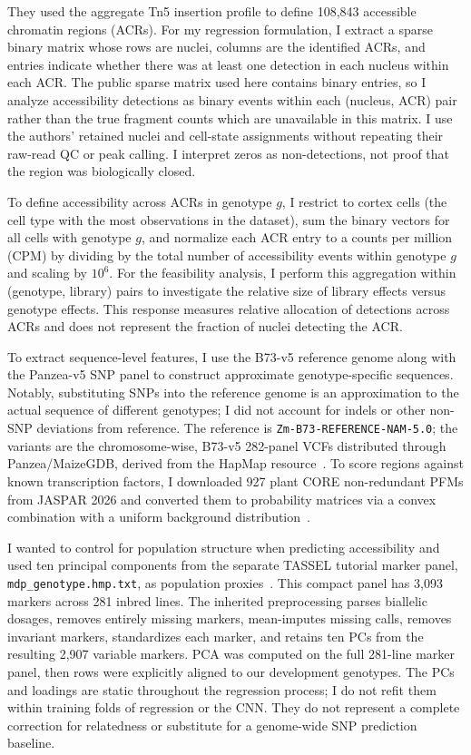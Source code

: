 \documentclass[10pt]{article}
\begin{document}
They used the aggregate Tn5 insertion profile to define 108,843 accessible chromatin regions (ACRs). For my regression formulation, I extract a sparse binary matrix whose rows are nuclei, columns are the identified ACRs, and entries indicate whether there was at least one detection in each nucleus within each ACR. The public sparse matrix used here contains binary entries, so I analyze accessibility detections as binary events within each (nucleus, ACR) pair rather than the true fragment counts which are unavailable in this matrix. I use the authors' retained nuclei and cell-state assignments without repeating their raw-read QC or peak calling. I interpret zeros as non-detections, not proof that the region was biologically closed.

To define accessibility across ACRs in genotype $g$, I restrict to cortex cells (the cell type with the most observations in the dataset), sum the binary vectors for all cells with genotype $g$, and normalize each ACR entry to a counts per million (CPM) by dividing by the total number of accessibility events within genotype $g$ and scaling by $10^6$. For the feasibility analysis, I perform this aggregation within (genotype, library) pairs to investigate the relative size of library effects versus genotype effects. This response measures relative allocation of detections across ACRs and does not represent the fraction of nuclei detecting the ACR.

To extract sequence-level features, I use the B73-v5 reference genome along with the Panzea-v5 SNP panel to construct approximate genotype-specific sequences. Notably, substituting SNPs into the reference genome is an approximation to the actual sequence of different genotypes; I did not account for indels or other non-SNP deviations from reference. The reference is \texttt{Zm-B73-REFERENCE-NAM-5.0}; the variants are the chromosome-wise, B73-v5 282-panel VCFs distributed through Panzea/MaizeGDB, derived from the HapMap resource~\cite{reference,panzea,hapmap}. To score regions against known transcription factors, I downloaded 927 plant CORE non-redundant PFMs from JASPAR 2026 and converted them to probability matrices via a convex combination with a uniform background distribution~\cite{jaspar}.

I wanted to control for population structure when predicting accessibility and used ten principal components from the separate TASSEL tutorial marker panel, \texttt{mdp\_genotype.hmp.txt}, as population proxies~\cite{tassel}. This compact panel has 3,093 markers across 281 inbred lines. The inherited preprocessing parses biallelic dosages, removes entirely missing markers, mean-imputes missing calls, removes invariant markers, standardizes each marker, and retains ten PCs from the resulting 2,907 variable markers. PCA was computed on the full 281-line marker panel, then rows were explicitly aligned to our development genotypes. The PCs and loadings are static throughout the regression process; I do not refit them within training folds of regression or the CNN. They do not represent a complete correction for relatedness or substitute for a genome-wide SNP prediction baseline.
\end{document}
